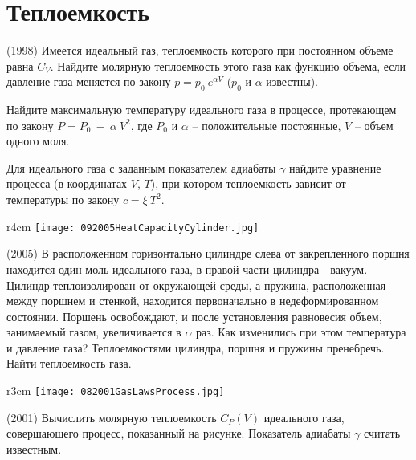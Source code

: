 \section{Теплоемкость}

\AddProb (1998) Имеется идеальный газ, теплоемкость которого при постоянном объеме равна $C_V$. 
Найдите молярную теплоемкость этого газа как функцию объема, если давление газа меняется по закону $p=p_0~e^{\alpha V}$ ($p_0$ и $\alpha$ известны).

\AddProb Найдите максимальную температуру идеального газа в процессе, протекающем по закону $P=P_0~-~\alpha~V^2$, 
где $P_0$ и $\alpha$ -- положительные постоянные, $V$ -- объем одного моля.

\AddProb Для идеального газа с заданным показателем адиабаты $\gamma$ найдите уравнение процесса (в координатах $V$, $T$), 
при котором теплоемкость зависит от температуры по закону $c=\xi~T^2$.

\begin{wrapfigure}{r}{4cm}
\texttt{[image: 092005HeatCapacityCylinder.jpg]}
\end{wrapfigure}

\AddProb (2005) В расположенном горизонтально цилиндре слева от закрепленного поршня находится один моль идеального газа, 
в правой части цилиндра - вакуум. Цилиндр теплоизолирован от окружающей среды, а пружина, расположенная между поршнем и стенкой, 
находится первоначально в недеформированном состоянии. Поршень освобождают, и после установления равновесия объем, занимаемый газом, 
увеличивается в $\alpha$ раз. Как изменились при этом температура и давление газа? Теплоемкостями цилиндра, поршня и пружины пренебречь. 
Найти теплоемкость газа.

\begin{wrapfigure}{r}{3cm}
\texttt{[image: 082001GasLawsProcess.jpg]}
\end{wrapfigure}

\AddProb (2001) Вычислить молярную теплоемкость $C_P(V)$ идеального газа, совершающего процесс, показанный на рисунке. 
Показатель адиабаты $\gamma$ считать известным.